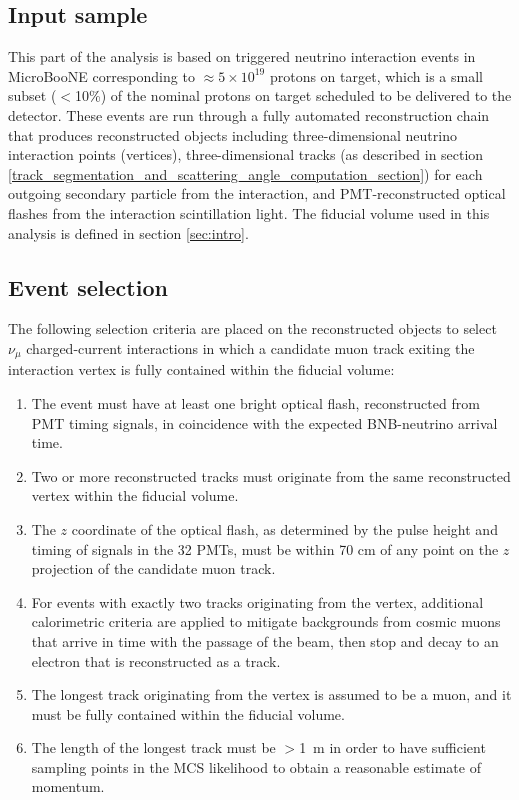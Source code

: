 \documentclass[a4paper,11pt]{article}
\begin{document}
\subsection{Input sample}\label{input_sample_section}
This part of the analysis is based on triggered neutrino interaction events in MicroBooNE corresponding to $\approx 5 \times 10^{19}$ protons on target, which is a small subset ($<$10\%) of the nominal protons on target scheduled to be delivered to the detector. These events are run through a fully automated reconstruction chain that produces reconstructed objects including three-dimensional neutrino interaction points (vertices), three-dimensional tracks (as described in section \ref{track_segmentation_and_scattering_angle_computation_section}) for each outgoing secondary particle from the interaction, and PMT-reconstructed optical flashes from the interaction scintillation light. The fiducial volume used in this analysis is defined in section \ref{sec:intro}.

\subsection{Event selection}
The following selection criteria are placed on the reconstructed objects to select $\nu_\mu$ charged-current interactions in which a candidate muon track exiting the interaction vertex is fully contained within the fiducial volume:
\begin{enumerate}
\item The event must have at least one bright optical flash, reconstructed from PMT timing signals, in coincidence with the expected BNB-neutrino arrival time.
\item Two or more reconstructed tracks must originate from the same reconstructed vertex within the fiducial volume.
\item The $z$ coordinate of the optical flash, as determined by the pulse height and timing of signals in the 32 PMTs, must be within 70 cm of any point on the $z$ projection of the candidate muon track.
\item For events with exactly two tracks originating from the vertex, additional calorimetric criteria are applied to mitigate backgrounds from cosmic muons that arrive in time with the passage of the beam, then stop and decay to an electron that is reconstructed as a track.
\item The longest track originating from the vertex is assumed to be a muon, and it must be fully contained within the fiducial volume.
\item The length of the longest track must be $>$1~m in order to have sufficient sampling points in the MCS likelihood to obtain a reasonable estimate of momentum.
\end{enumerate}
\end{document}

